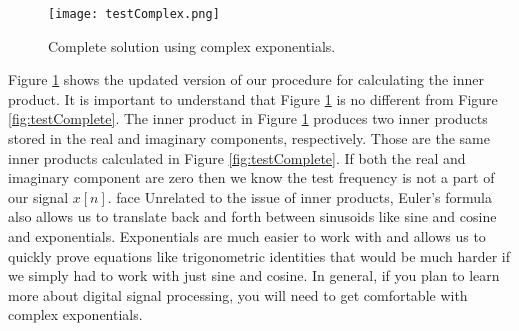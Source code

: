 \begin{figure}[h]
	\caption{Complete solution using complex exponentials.}
	\centering
	\texttt{[image: testComplex.png]}
	\label{fig:testComplex}
\end{figure}

Figure \ref{fig:testComplex} shows the updated version of our procedure for calculating the inner product.
It is important to understand that Figure \ref{fig:testComplex} is no different from Figure \ref{fig:testComplete}.  
The inner product in Figure \ref{fig:testComplex} produces two inner products stored in the real and imaginary
components, respectively.  Those are the same inner products calculated in Figure \ref{fig:testComplete}.  If
both the real and imaginary component are zero then we know the test frequency is not a part of our signal
$x[n]$.
face
Unrelated to the issue of inner products, Euler's
formula also allows us to translate back and forth between sinusoids like sine and cosine and exponentials.
Exponentials are much easier to work with and allows us to quickly prove equations like trigonometric identities
that would be much harder if we simply had to work with just sine and cosine.  In general, if you plan to learn
more about digital signal processing, you will need to get comfortable with complex exponentials.

